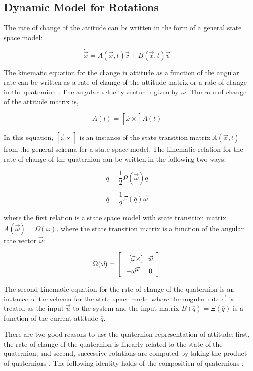 \documentclass{article}
\newcommand{\mat}[2][ccccccccccccccccccccccccccccccccccccccccccccc]{\left[
        \arraycolsep=4pt\def\arraystretch{1.5}
        \begin{array}{#1} #2 \\ 
        \end{array} 
        \right]}
\begin{document}
\begin{flushleft}
\subsection{Dynamic Model for Rotations}

The rate of change of the attitude can be written in the form of a general state space model: 

\[ \dot{\vec{x}} = A(\vec{x}, t) \vec{x} + B(\vec{x}, t) \vec{u} \]

The kinematic equation for the change in attitude as a function of the angular rate can be written as a rate of change of the attitude matrix or a rate of change in the quaternion \cite{Shuster1982}. The angular velocity vector is given by $\vec{\omega}$. The rate of change of the attitude matrix is, 

\[ \dot{A}(t) = [\vec{\omega}\times] A(t) \]

In this equation, $[\vec{\omega}\times]$ is an instance of the state transition matrix $A(\vec{x}, t)$ from the general schema for a state space model. The kinematic relation for the rate of change of the quaternion can be written in the following two ways: 

\[ \dot{\overline{q}} = \frac{1}{2} \Omega( \vec{\omega} ) \overline{q} \]

\[ \dot{\overline{q}} = \frac{1}{2} \Xi( \overline{q} )\vec{\omega} \]

where the first relation is a state space model with state transition matrix $A(\vec{\omega}) = \Omega(\omega)$, where the state transition matrix is a function of the angular rate vector $\vec{\omega}$:

\[ \Omega(\vec{\omega}) = \mat{ -[\vec{\omega}\times] & \vec{w} \\ -\vec{\omega}^T & 0 } \] 

The second kinematic equation for the rate of change of the quaternion is an instance of the schema for the state space model where the angular rate $\vec{\omega}$ is treated as the input $\vec{u}$ to the system and the input matrix $B(\overline{q}) = \Xi(\overline{q})$ is a function of the current attitude $\overline{q}$. 

\medskip

There are two good reasons to use the quaternion representation of attitude: first, the rate of change of the quaternion is linearly related to the state of the quaternion; and second, successive rotations are computed by taking the product of quaternions \cite{Markley2007}. The following identity holds of the composition of quaternions \cite{Shuster1982}: 


\end{flushleft}
\end{document}
